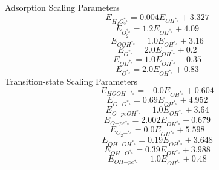 \documentclass[a4paper,8pt]{report}
\begin{document}
Adsorption Scaling Parameters\\
\begin{equation}
\label{ads_scaling_1}
E_{H_{2}O_{2}^{*_a}} = 0.004E_{OH^{*_a}} + 3.327
\end{equation}
\begin{equation}
\label{ads_scaling_2}
E_{O_{2}^{*_a}} = 1.2E_{OH^{*_a}} + 4.09
\end{equation}
\begin{equation}
\label{ads_scaling_3}
E_{OOH^{*_a}} = 1.0E_{OH^{*_a}} + 3.16
\end{equation}
\begin{equation}
\label{ads_scaling_4}
E_{O^{*_a}} = 2.0E_{OH^{*_a}} + 0.2
\end{equation}
\begin{equation}
\label{ads_scaling_5}
E_{OH^{*_b}} = 1.0E_{OH^{*_a}} + 0.35
\end{equation}
\begin{equation}
\label{ads_scaling_6}
E_{O^{*_b}} = 2.0E_{OH^{*_a}} + 0.83
\end{equation}
Transition-state Scaling Parameters\\
\begin{equation}
\label{TS_scaling_1}
E_{HOOH\mathrm{-}^{*_a}} = -0.0E_{OH^{*_a}} + 0.604
\end{equation}
\begin{equation}
\label{TS_scaling_2}
E_{O\mathrm{-}O^{*_a}} = 0.69E_{OH^{*_a}} + 4.952
\end{equation}
\begin{equation}
\label{TS_scaling_3}
E_{O\mathrm{-}peOH^{*_a}} = 1.0E_{OH^{*_a}} + 3.64
\end{equation}
\begin{equation}
\label{TS_scaling_4}
E_{O\mathrm{-}pe^{*_a}} = 2.002E_{OH^{*_a}} + 0.679
\end{equation}
\begin{equation}
\label{TS_scaling_5}
E_{O_{2}\mathrm{-}^{*_a}} = 0.0E_{OH^{*_a}} + 5.598
\end{equation}
\begin{equation}
\label{TS_scaling_6}
E_{OH\mathrm{-}OH^{*_a}} = 0.19E_{OH^{*_a}} + 3.648
\end{equation}
\begin{equation}
\label{TS_scaling_7}
E_{OH\mathrm{-}O^{*_a}} = 0.39E_{OH^{*_a}} + 3.988
\end{equation}
\begin{equation}
\label{TS_scaling_8}
E_{OH\mathrm{-}pe^{*_a}} = 1.0E_{OH^{*_a}} + 0.48
\end{equation}
\end{document}
